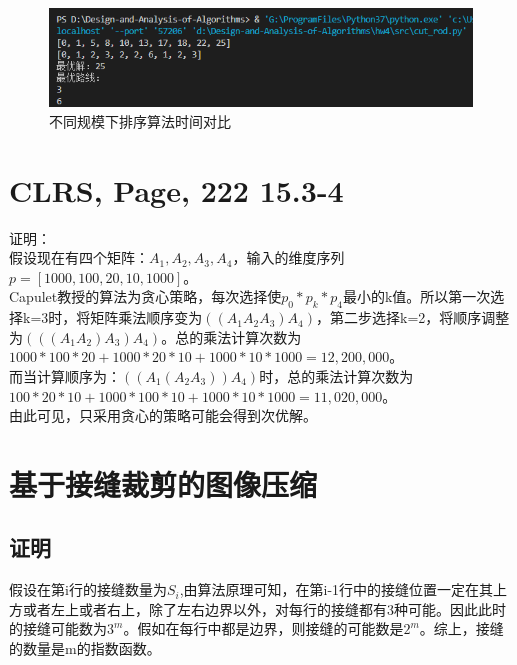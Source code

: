 \documentclass[UTF8]{ctexart}
\begin{document}
\begin{figure}[H]
    \centering
    \includegraphics[width=1\textwidth]{img/res-1.png}
    \caption{不同规模下排序算法时间对比}
    \label{带切割方案的备忘录方法}
\end{figure}



\section{CLRS, Page, 222 15.3-4}

证明：\\
假设现在有四个矩阵：$A_1, A_2, A_3, A_4$，输入的维度序列$ p = [1000, 100, 20, 10,1000] $。\\
Capulet教授的算法为贪心策略，每次选择使$p_0 * p_k * p_4$最小的k值。所以第一次选择k=3时，将矩阵乘法顺序变为$((A_1A_2A_3)A_4)$，第二步选择k=2，将顺序调整为$(((A_1A_2)A_3)A_4)$。总的乘法计算次数为$1000*100*20 + 1000*20*10 + 1000 * 10 * 1000 = 12,200,000$。\\

而当计算顺序为：$((A_1(A_2A_3))A_4)$时，总的乘法计算次数为$100*20*10 + 1000*100*10 + 1000 * 10 * 1000 = 11,020,000$。\\

由此可见，只采用贪心的策略可能会得到次优解。
  

\section{基于接缝裁剪的图像压缩}

\subsection{证明}
假设在第i行的接缝数量为$S_i$,由算法原理可知，在第i-1行中的接缝位置一定在其上方或者左上或者右上，除了左右边界以外，对每行的接缝都有3种可能。因此此时的接缝可能数为$3^m$。假如在每行中都是边界，则接缝的可能数是$2^m$。综上，接缝的数量是m的指数函数。
\end{document}
